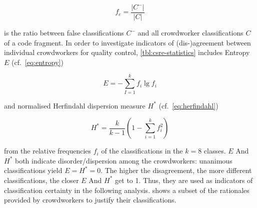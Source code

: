 \begin{equation}f_e = \frac{|C^-|}{|C|}\label{eq:errorrate}\end{equation}

is the ratio between false classifications \(C^-\) and all crowdworker classifications \(C\) of a code fragment.
In order to investigate indicators of (dis-)agreement between individual crowdworkers for quality control, \cref{tbl:csre-statistics} includes Entropy \(E\) (cf.~\cref{eq:entropy})

\begin{equation}E = - \sum\limits^k_{I=1}f_i \lg f_i\label{eq:entropy}\end{equation}

and normalised Herfindahl dispersion measure \(H^*\) (cf.~\cref{eq:herfindahl})

\begin{equation}H^*=\frac{k}{k-1}\left(1-\sum\limits_{i=1}^{k}f_i^2\right)\label{eq:herfindahl}\end{equation}

from the relative frequencies \(f_i\) of the classifications in the \(k=8\) classes.
\(E\) And \(H^*\) both indicate disorder/dispersion among the crowdworkers: unanimous classifications yield \(E=H^*=0\).
The higher the disagreement, the more different classifications, the closer \(E\) And \(H^*\) get to 1.
Thus, they are used as indicators of classification certainty in the following analysis.
 shows a subset of the rationales provided by crowdworkers to justify their classifications.

